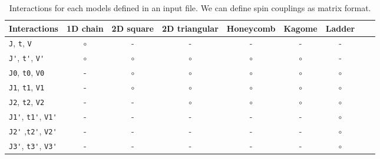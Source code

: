 \begin{table}[hbp]
  \begin{tabular}{|l||c|c|c|c|c|c|c|c|} \hline
    Interactions & 1D chain & 2D square & 2D triangular & Honeycomb & Kagome & Ladder\\ \hline \hline
   \verb|J|, \verb|t|, \verb|V| & $\circ$	 & - 	& - 	& - 	& - 	& -\\ \hline
    \verb|J'|, \verb|t'|, \verb|V'| & $\circ$	 & $\circ$	& $\circ$ 	& $\circ$ 	& $\circ$ & - \\ \hline
   \verb|J0|, \verb|t0|, \verb|V0| & -	 & $\circ$ 	& $\circ$ 	& $\circ$ 	& $\circ$ & $\circ$\\ \hline
    \verb|J1|, \verb|t1|, \verb|V1| & -         	 & $\circ$ 	& $\circ$ 	& $\circ$ 	& $\circ$ & $\circ$\\ \hline
    \verb|J2|, \verb|t2|, \verb|V2|  & -         	 & -    	& $\circ$ 	& $\circ$ 	& $\circ$ & $\circ$\\ \hline
    \verb|J1'|, \verb|t1'|, \verb|V1'| & -		 &-	 	& -		& -		& -		& $\circ$ 	\\ \hline
    \verb|J2'| ,\verb|t2'|, \verb|V2'|  & -		 &-	 	& -		& -		& -		& $\circ$\\ \hline
    \verb|J3'|, \verb|t3'|, \verb|V3'|  & -		 &-	 	& -		& -		& -		& $\circ$\\ \hline
  \end{tabular}
   \caption{Interactions for each models defined in an input file. We can define spin couplings as matrix format.}
    \label{table_interactions}
\end{table}

